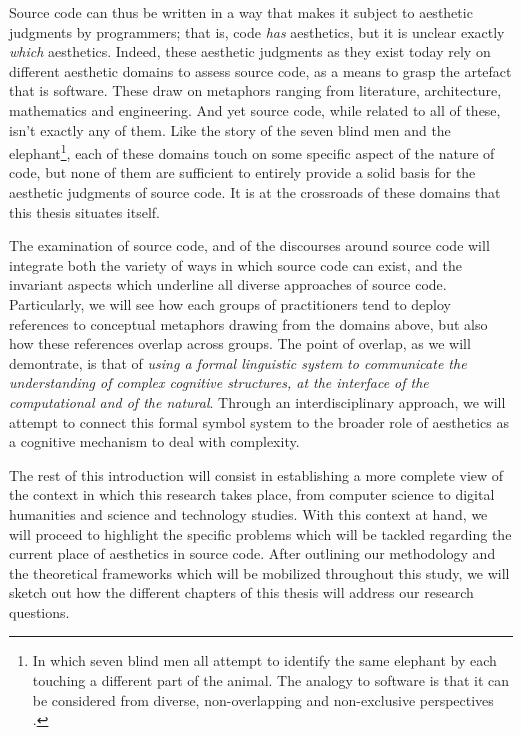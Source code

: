 Source code can thus be written in a way that makes it subject to aesthetic judgments by programmers; that is, code \emph{has} aesthetics, but it is unclear exactly \emph{which} aesthetics. Indeed, these aesthetic judgments as they exist today rely on different aesthetic domains to assess source code, as a means to grasp the artefact that is software. These draw on metaphors ranging from literature, architecture, mathematics and engineering. And yet source code, while related to all of these, isn't exactly any of them. Like the story of the seven blind men and the elephant\footnote{In which seven blind men all attempt to identify the same elephant by each touching a different part of the animal. The analogy to software is that it can be considered from diverse, non-overlapping and non-exclusive perspectives \citep{chun_sourcery_2008}.}, each of these domains touch on some specific aspect of the nature of code, but none of them are sufficient to entirely provide a solid basis for the aesthetic judgments of source code. It is at the crossroads of these domains that this thesis situates itself.

The examination of source code, and of the discourses around source code will integrate both the variety of ways in which source code can exist, and the invariant aspects which underline all diverse approaches of source code. Particularly, we will see how each groups of practitioners tend to deploy references to conceptual metaphors drawing from the domains above, but also how these references overlap across groups. The point of overlap, as we will demontrate, is that of \emph{using a formal linguistic system to communicate the understanding of complex cognitive structures, at the interface of the computational and of the natural}. Through an interdisciplinary approach, we will attempt to connect this formal symbol system to the broader role of aesthetics as a cognitive mechanism to deal with complexity.

The rest of this introduction will consist in establishing a more complete view of the context in which this research takes place, from computer science to digital humanities and science and technology studies. With this context at hand, we will proceed to highlight the specific problems which will be tackled regarding the current place of aesthetics in source code. After outlining our methodology and the theoretical frameworks which will be mobilized throughout this study, we will sketch out how the different chapters of this thesis will address our research questions.

